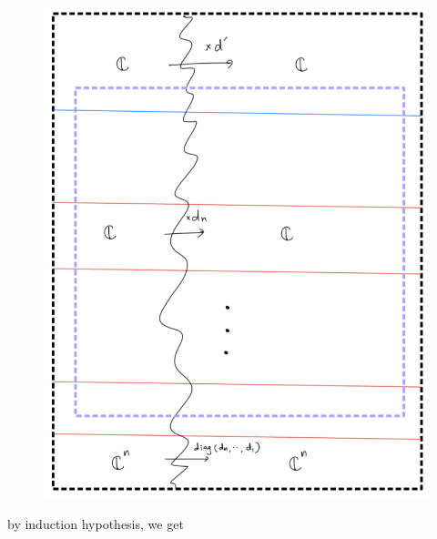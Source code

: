 \begin{enumerate}[label = (\roman*)]
\begin{enumerate}[label = (Step \arabic*)]
\begin{figure}[H]
    \centering
    \includegraphics[scale = 0.95]{diagrams/cobord5/4.png} 
    \caption{}
    \label{fig:your-label}
\end{figure}
\pagebreak 
by induction hypothesis, we get


\end{enumerate}
\end{enumerate}
